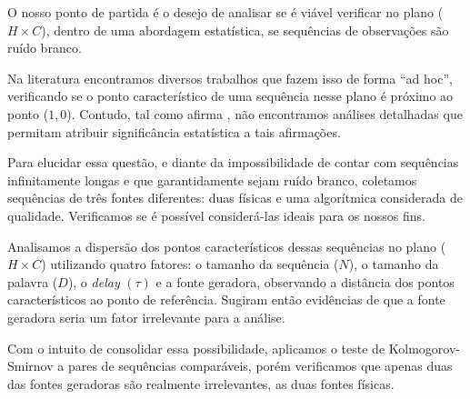 \documentclass[tcc]{ic}
\begin{document}

\capa


\begin{resumo}
\noindent 


O nosso ponto de partida é o desejo de analisar
se é viável verificar no plano ($H\times C$), dentro de uma abordagem estatística, se sequências de observações são ruído branco.

Na literatura encontramos diversos trabalhos que fazem isso de forma ``ad hoc'', verificando se o ponto característico de uma sequência nesse plano é próximo ao ponto ($1,0$). 
Contudo, tal como afirma \citet{NewPermutationEntropy}, não encontramos análises detalhadas que permitam atribuir significância estatística a tais afirmações.

Para elucidar essa questão, e diante da impossibilidade de contar com sequências infinitamente longas e que garantidamente sejam ruído branco, coletamos sequências de três fontes diferentes: duas físicas e uma algorítmica considerada de qualidade.
Verificamos se é possível considerá-las ideais para os nossos fins.

Analisamos a dispersão dos pontos característicos dessas sequências no plano ($H\times C$) utilizando quatro fatores: o tamanho da sequência ($N$), o tamanho da palavra ($D$), o \textit{delay} $(\tau)$ e a fonte geradora, observando a distância dos pontos característicos ao ponto de referência. Sugiram então evidências de que a fonte geradora seria um fator irrelevante para a análise.

Com o intuito de consolidar essa possibilidade, aplicamos o teste de Kolmogorov-Smirnov a pares de sequências comparáveis, porém verificamos que apenas duas das fontes geradoras são realmente irrelevantes, as duas fontes físicas.


\end{resumo}
\end{document}
